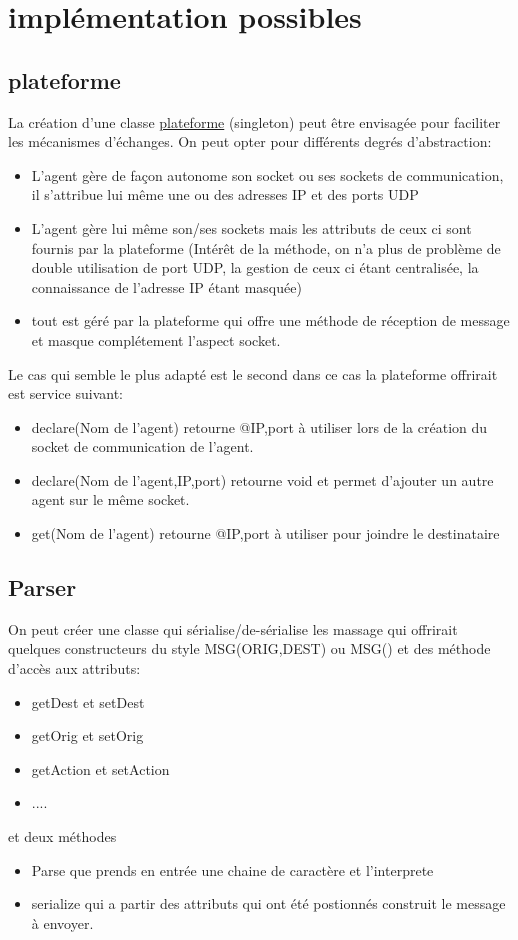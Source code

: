 \documentclass[french]{article}
\begin{document}
\section{implémentation possibles}
\subsection{plateforme}
La création d'une classe \underline{plateforme} (singleton) peut être envisagée pour faciliter les mécanismes d'échanges. On peut opter pour différents degrés d'abstraction:
\begin{itemize}
	\item L'agent gère de façon autonome son socket ou ses sockets de communication, il s'attribue lui même une ou des adresses IP et des ports UDP
	\item L'agent gère lui même son/ses sockets mais les attributs de ceux ci sont fournis par la plateforme (Intérêt de la méthode, on n'a plus de problème de double utilisation de port UDP, la gestion de ceux ci étant centralisée, la connaissance de l'adresse IP étant masquée)
	\item tout est géré par la plateforme qui offre une méthode de réception de message et masque complétement l'aspect socket.
\end{itemize}
Le cas qui semble le plus adapté est le second dans ce cas la plateforme offrirait est service suivant:
\begin{itemize}
	\item declare(Nom de l'agent) retourne @IP,port à utiliser lors de la création du socket de communication de l'agent.
	\item declare(Nom de l'agent,IP,port) retourne void et permet d'ajouter un autre agent sur le même socket.
	\item get(Nom de l'agent) retourne @IP,port à utiliser pour joindre le destinataire	
\end{itemize}
\subsection{Parser}
On peut créer une classe qui sérialise/de-sérialise les massage qui offrirait quelques constructeurs du style MSG(ORIG,DEST) ou MSG() et des méthode d'accès aux attributs:
\begin{itemize}
	\item getDest et setDest
	\item getOrig et setOrig
	\item getAction et setAction
	\item ....
\end{itemize}
et deux méthodes
\begin{itemize}
	\item Parse que prends en entrée une chaine de caractère et l'interprete
	\item serialize qui a partir des attributs qui ont été postionnés construit le message à envoyer.
\end{itemize}
\end{document}
